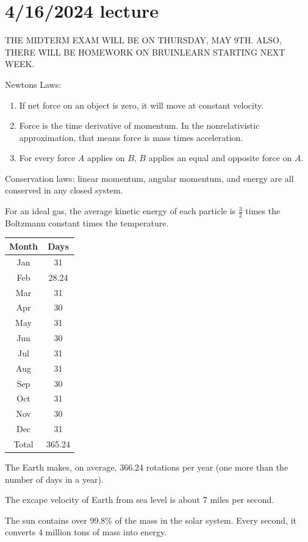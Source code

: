 \documentclass[class=article, crop=false]{standalone}
\begin{document}
\section{4/16/2024 lecture}
THE MIDTERM EXAM WILL BE ON THURSDAY, MAY 9TH. ALSO, THERE WILL BE HOMEWORK ON BRUINLEARN STARTING NEXT WEEK.
\par
Newtons Laws:
\begin{enumerate}
    \item If net force on an object is zero, it will move at constant velocity.
    \item Force is the time derivative of momentum. In the nonrelativistic approximation, that means force is mass times acceleration.
    \item For every force $A$ applies on $B$, $B$ applies an equal and opposite force on $A$.
\end{enumerate}
Conservation laws: linear momentum, angular momentum, and energy are all conserved in any closed system.
\par
For an ideal gas, the average kinetic energy of each particle is $ \frac{3}{2}$ times the Boltzmann constant times the temperature.
\par
\begin{center}
    \begin{tabular}{ |c|c| } 
    \hline
    Month & Days \\
    \hline
    \hline
    Jan & 31 \\
    \hline
    Feb & 28.24 \\
    \hline
    Mar & 31 \\
    \hline
    Apr & 30 \\
    \hline
    May & 31 \\
    \hline
    Jun & 30 \\
    \hline
    Jul & 31 \\
    \hline
    Aug & 31 \\
    \hline
    Sep & 30 \\
    \hline
    Oct & 31 \\
    \hline
    Nov & 30 \\
    \hline
    Dec & 31 \\
    \hline
    \hline
    Total & 365.24 \\
    \hline
\end{tabular}
\end{center}
The Earth makes, on average, 366.24 rotations per year (one more than the number of days in a year).
\par
The excape velocity of Earth from sea level is about 7 miles per second.
\par
The sun contains over 99.8\% of the mass in the solar system. Every second, it converts 4 million tons of mass into energy.
\end{document}
